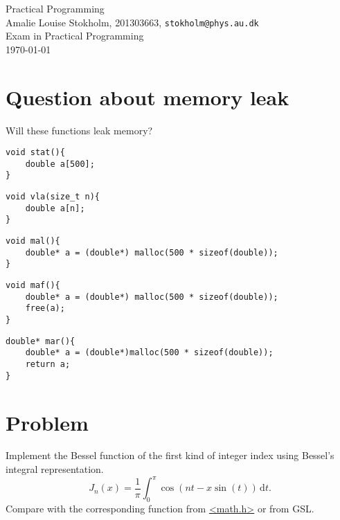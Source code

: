 \documentclass[a4paper,oneside,11pt,article]{memoir}
\author{Amalie Louise Stokholm}
\date{\today}
\begin{document}
\begin{center}
  \sffamily
    {\Large Practical Programming} \\
    \vspace{.8em}
    {Amalie Louise Stokholm, 201303663, \texttt{stokholm@phys.au.dk}} \\ {Exam in Practical Programming} \\
  {\today} \\
\end{center}
\chapter*{Question about memory leak}
Will these functions leak memory?
\begin{lstlisting}
void stat(){
	double a[500];
}
\end{lstlisting}

\begin{lstlisting}
void vla(size_t n){
	double a[n];
}
\end{lstlisting}

\begin{lstlisting}
void mal(){
	double* a = (double*) malloc(500 * sizeof(double));
}
\end{lstlisting}

\begin{lstlisting}
void maf(){
	double* a = (double*) malloc(500 * sizeof(double));
	free(a);
}
\end{lstlisting}

\begin{lstlisting}
double* mar(){
	double* a = (double*)malloc(500 * sizeof(double));
	return a;
}
\end{lstlisting}


\clearpage
\chapter*{Problem}
Implement the Bessel function of the first kind of integer index using Bessel’s integral
representation.
\begin{equation}
J_n(x) = \frac{1}{\pi} \int_{0}^{\pi} \cos(nt - x \sin(t))\,\text{d}t.
\end{equation}
Compare with the corresponding function from \url{<math.h>} or from GSL.
\end{document}
